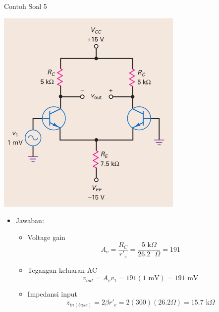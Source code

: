 \documentclass[aspectratio=169]{beamer}
\begin{document}
\begin{frame}{Contoh Soal 5}
	\begin{multicols}{2}
		\begin{center}
			\includegraphics[height=0.7\textheight]{gambar/01.contoh_soal_1-2}
		\end{center}
		\columnbreak
		\begin{itemize}
			\item Jawaban:
			\begin{itemize}
				\item Voltage gain
				\[ A_v = \frac{R_C}{r'_e} = \frac{5 \text{ k}\Omega }{26.2 \text{ }\Omega } = 191 \]
				\item Tegangan keluaran AC
				\[ v_{out} = A_v v_1 = 191(1 \text{ mV}) = 191 \text{ mV} \]
				\item Impedansi input
				\[ z_{in(base)} = 2 \beta r'_e = 2(300)(26.2\Omega) = 15.7 \text{ k}\Omega\]
			\end{itemize}
		\end{itemize}
	\end{multicols}
\end{frame}
\end{document}
